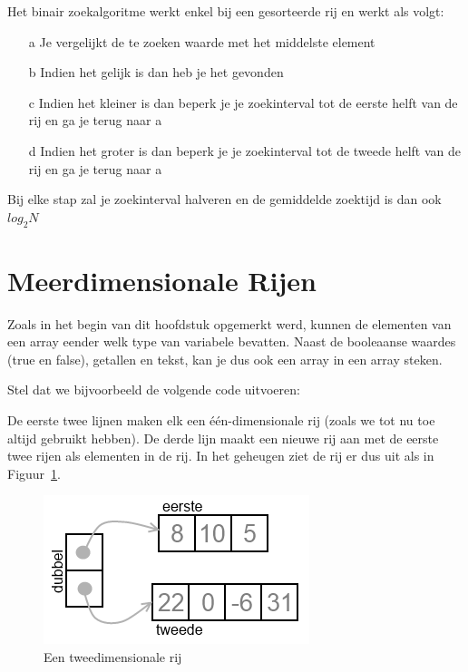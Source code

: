 Het binair zoekalgoritme werkt enkel bij een gesorteerde rij en werkt als volgt:

\begin{itemize}
\item[a] Je vergelijkt de te zoeken waarde met het middelste element
\item[b] Indien het gelijk is dan heb je het gevonden
\item[c] Indien het kleiner is dan beperk je je zoekinterval tot de eerste helft van de rij en ga je terug naar a
\item[d] Indien het groter is dan beperk je je zoekinterval tot de tweede helft van de rij en ga je terug naar a
\end{itemize}

Bij elke stap zal je zoekinterval halveren en de gemiddelde zoektijd is dan ook $log_{2}N$


\section{Meerdimensionale Rijen}

Zoals in het begin van dit hoofdstuk opgemerkt werd, kunnen de elementen van een array eender welk type van variabele bevatten. Naast de booleaanse waardes (true en false), getallen en tekst, kan je dus ook een array in een array steken.

Stel dat we bijvoorbeeld de volgende code uitvoeren:


De eerste twee lijnen maken elk een \'e\'en-dimensionale rij (zoals we tot nu toe altijd gebruikt hebben). De derde lijn maakt een nieuwe rij aan met de eerste twee rijen als elementen in de rij. In het geheugen ziet de rij er dus uit als in Figuur~\ref{fig:rij2dim}.

\begin{figure}
\centering
\includegraphics[scale=0.8]{Rijen/rij2dim.png}
\caption{Een tweedimensionale rij}\label{fig:rij2dim}
\end{figure}

